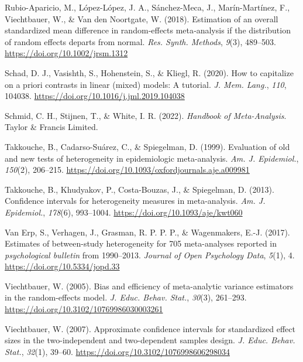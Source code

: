 \documentclass[
  man,floatsintext]{apa6}
\newlength{\cslhangindent}
\newenvironment{CSLReferences}[2] %
 {\begin{list}{}{%
  \setlength{\itemindent}{0pt}
  \setlength{\leftmargin}{0pt}
  \setlength{\parsep}{0pt}
  \ifodd #1
   \setlength{\leftmargin}{\cslhangindent}
   \setlength{\itemindent}{-1\cslhangindent}
  \fi
  \setlength{\itemsep}{#2\baselineskip}}}
 {\end{list}}
\begin{document}
\begin{CSLReferences}{1}{0}
Rubio-Aparicio, M., López-López, J. A., Sánchez-Meca, J., Marín-Martínez, F., Viechtbauer, W., \& Van den Noortgate, W. (2018). Estimation of an overall standardized mean difference in random‐effects meta‐analysis if the distribution of random effects departs from normal. \emph{Res. Synth. Methods}, \emph{9}(3), 489--503. \url{https://doi.org/10.1002/jrsm.1312}

Schad, D. J., Vasishth, S., Hohenstein, S., \& Kliegl, R. (2020). How to capitalize on a priori contrasts in linear (mixed) models: A tutorial. \emph{J. Mem. Lang.}, \emph{110}, 104038. \url{https://doi.org/10.1016/j.jml.2019.104038}

Schmid, C. H., Stijnen, T., \& White, I. R. (2022). \emph{Handbook of {Meta-Analysis}}. Taylor \& Francis Limited.

Takkouche, B., Cadarso-Suárez, C., \& Spiegelman, D. (1999). Evaluation of old and new tests of heterogeneity in epidemiologic meta-analysis. \emph{Am. J. Epidemiol.}, \emph{150}(2), 206--215. \url{https://doi.org/10.1093/oxfordjournals.aje.a009981}

Takkouche, B., Khudyakov, P., Costa-Bouzas, J., \& Spiegelman, D. (2013). Confidence intervals for heterogeneity measures in meta-analysis. \emph{Am. J. Epidemiol.}, \emph{178}(6), 993--1004. \url{https://doi.org/10.1093/aje/kwt060}

Van Erp, S., Verhagen, J., Grasman, R. P. P. P., \& Wagenmakers, E.-J. (2017). Estimates of between-study heterogeneity for 705 meta-analyses reported in \emph{psychological bulletin} from 1990--2013. \emph{Journal of Open Psychology Data}, \emph{5}(1), 4. \url{https://doi.org/10.5334/jopd.33}

Viechtbauer, W. (2005). Bias and efficiency of meta-analytic variance estimators in the random-effects model. \emph{J. Educ. Behav. Stat.}, \emph{30}(3), 261--293. \url{https://doi.org/10.3102/10769986030003261}

Viechtbauer, W. (2007). Approximate confidence intervals for standardized effect sizes in the two-independent and two-dependent samples design. \emph{J. Educ. Behav. Stat.}, \emph{32}(1), 39--60. \url{https://doi.org/10.3102/1076998606298034}


\end{CSLReferences}
\end{document}

